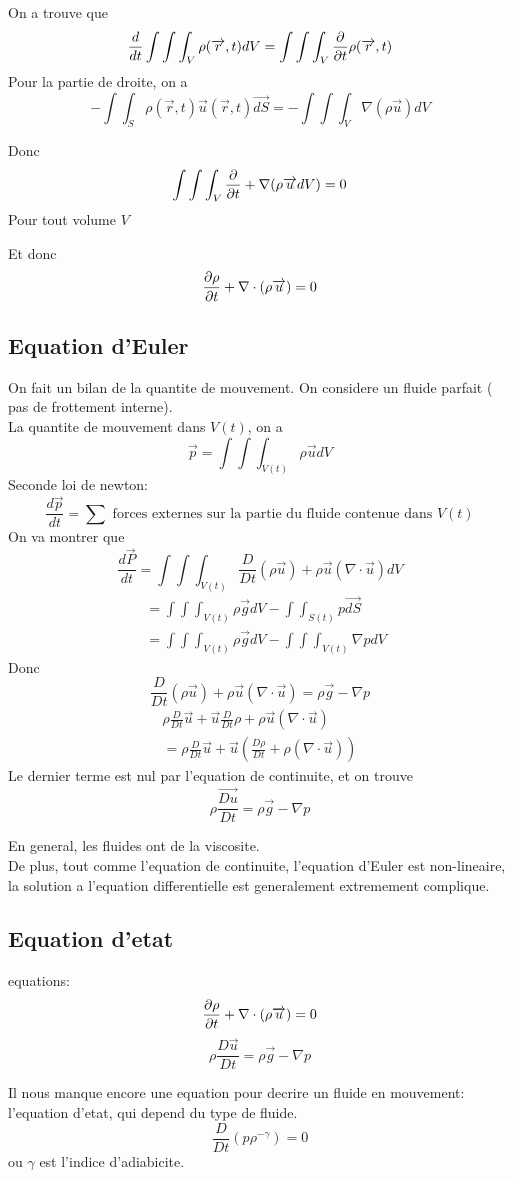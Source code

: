 \documentclass[../main.tex]{subfiles}
\begin{document}
On a trouve que
\[ 
	\frac{d}{dt} \int \int \int _V \rho( \overrightarrow{r},t) dV = \int \int \int_V \frac{\partial}{\partial t}\rho( \overrightarrow{r},t) 
\]
Pour la partie de droite, on a
\[ 
	- \int \int_S \rho( \vec{r},t) \vec{u}( \vec{r},t) \vec{dS} = - \int \int \int_V \nabla ( \rho\vec{u})  dV
\]

Donc
\[ 
	\int \int \int_V \frac{\partial}{\partial t   }+ \nabla( \rho\overrightarrow{u} dV)  =0
\]
Pour tout volume $V$

Et donc
\[ 
	\frac{\partial \rho}{\partial t}+ \nabla\cdot( \rho \overrightarrow{u}) =0
\]

\subsection{Equation d'Euler}
On fait un bilan de la quantite de mouvement.
On considere un fluide parfait ( pas de frottement interne).\\
La quantite de mouvement dans $V( t) $, on a 
\[ 
	\vec{p} = \int \int \int_{V( t) }  \rho \vec{u} dV
\]
Seconde loi de newton:
\[ 
	\frac{d \vec{p}}{dt}= \sum \text{ forces externes sur la partie du fluide contenue dans  } V( t) 
\]
On va montrer que 
\[ 
	\frac{d \vec{P}}{dt} = \int \int \int_{V( t) }  \frac{D}{Dt}( \rho \vec{u}) + \rho \vec{u}( \nabla \cdot \vec{u}) dV
\]
\begin{align*}
	&= \int \int\int_{V( t) } \rho \vec{g} dV - \int \int_{S( t) }  p \vec{dS}	\\
	&= \int \int\int_{V( t) } \rho \vec{g} dV  - \int \int\int_{V( t) }  \nabla p dV	
\end{align*}
Donc
\[ 
	\frac{D}{Dt}( \rho \vec{u}) + \rho \vec{u} ( \nabla \cdot \vec{u}) = \rho \vec{g} - \nabla p
\]
\begin{align*}
	\rho \frac{D}{Dt}\vec{u} + \vec{u} \frac{D}{Dt}\rho + \rho \vec{u}( \nabla \cdot \vec{u})\\
	= \rho \frac{D}{Dt}\vec{u} + \vec{u} ( \frac{D\rho}{Dt} + \rho ( \nabla \cdot \vec{u}) ) 
\end{align*}
Le dernier terme est nul par l'equation de continuite, et on trouve
\[ 
\rho \frac{\vec{Du}}{Dt} = \rho \vec{g} - \nabla p
\]

\begin{rmq}
En general, les fluides ont de la viscosite.\\
De plus, tout comme l'equation de continuite, l'equation d'Euler est non-lineaire, la solution a l'equation differentielle est generalement extremement complique.
\end{rmq}
\subsection{Equation d'etat}
equations:
\[ 
	\frac{\partial \rho}{\partial t} + \nabla \cdot ( \rho \overrightarrow{u}) =0
\]
\[ 
\rho \frac{D \vec{u}}{Dt}= \rho \vec{g} - \nabla p
\]

Il nous manque encore une equation pour decrire un fluide en mouvement: l'equation d'etat, qui depend du type de fluide.
\[ 
	\frac{D}{Dt}( p\rho^{-\gamma}) =0
\]
ou $\gamma$ est l'indice d'adiabicite.
\end{document}
